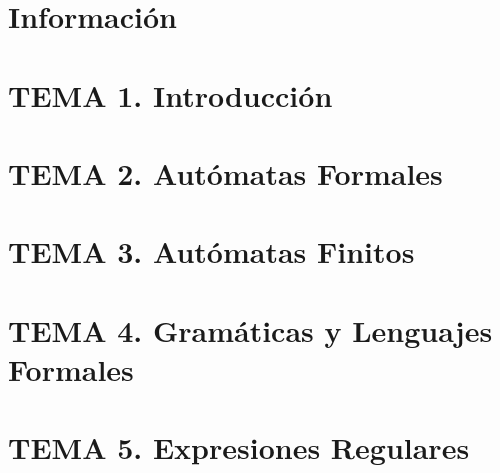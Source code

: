 \documentclass[12pt, twoside, openright]{report} %
\begin{document}
\clearpage
{} %




\part{Información}



\part{TEMA 1. Introducción}


\part{TEMA 2. Autómatas Formales}



\part{TEMA 3. Autómatas Finitos}








\part{TEMA 4. Gramáticas y Lenguajes Formales}








\part{TEMA 5. Expresiones Regulares}




\end{document}
